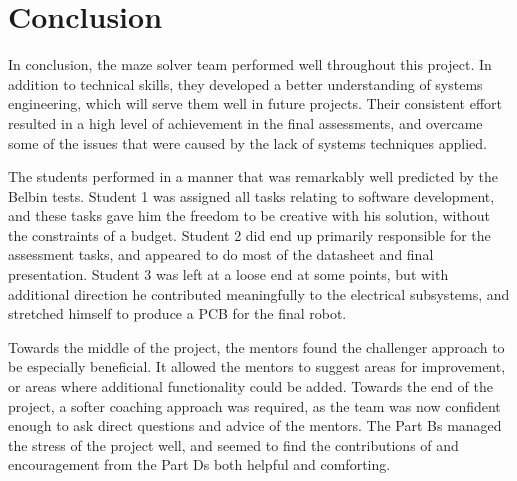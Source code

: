 

\section{Conclusion}\label{sec:conclusion}
    In conclusion, the maze solver team performed well throughout this project.
    In addition to technical skills, they developed a better understanding of systems engineering, which will serve them well in future projects.
    Their consistent effort resulted in a high level of achievement in the final assessments, and overcame some of the issues that were caused by the lack of systems techniques applied.

    The students performed in a manner that was remarkably well predicted by the Belbin tests.
    Student 1 was assigned all tasks relating to software development, and these tasks gave him the freedom to be creative with his solution, without the constraints of a budget.
    Student 2 did end up primarily responsible for the assessment tasks, and appeared to do most of the datasheet and final presentation.
    Student 3 was left at a loose end at some points, but with additional direction he contributed meaningfully to the electrical subsystems, and stretched himself to produce a PCB for the final robot.

    Towards the middle of the project, the mentors found the challenger approach to be especially beneficial.
    It allowed the mentors to suggest areas for improvement, or areas where additional functionality could be added.
    Towards the end of the project, a softer coaching approach was required, as the team was now confident enough to ask direct questions and advice of the mentors.
    The Part Bs managed the stress of the project well, and seemed to find the contributions of and encouragement from the Part Ds both helpful and comforting.